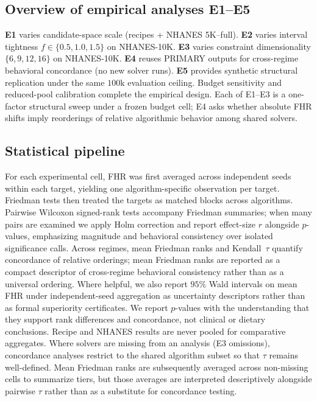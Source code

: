 \documentclass[lettersize,journal]{IEEEtran}
\begin{document}
\subsection{Overview of empirical analyses E1--E5}
\textbf{E1} varies candidate-space scale (recipes + NHANES 5K--full).
\textbf{E2} varies interval tightness $f\in\{0.5,1.0,1.5\}$ on NHANES-10K.
\textbf{E3} varies constraint dimensionality $\{6,9,12,16\}$ on NHANES-10K.
\textbf{E4} reuses PRIMARY outputs for cross-regime behavioral concordance (no new solver runs).
\textbf{E5} provides synthetic structural replication under the same $100\mathrm{k}$ evaluation ceiling.
Budget sensitivity and reduced-pool calibration complete the empirical design.
Each of E1--E3 is a one-factor structural sweep under a frozen budget cell; E4 asks whether absolute FHR shifts imply reorderings of relative algorithmic behavior among shared solvers.

\subsection{Statistical pipeline}
For each experimental cell, FHR was first averaged across independent seeds within each target, yielding one algorithm-specific observation per target.
Friedman tests then treated the targets as matched blocks across algorithms.
Pairwise Wilcoxon signed-rank tests accompany Friedman summaries; when many pairs are examined we apply Holm correction and report effect-size $r$ alongside $p$-values, emphasizing magnitude and behavioral consistency over isolated significance calls.
Across regimes, mean Friedman ranks and Kendall~$\tau$ quantify concordance of relative orderings; mean Friedman ranks are reported as a compact descriptor of cross-regime behavioral consistency rather than as a universal ordering.
Where helpful, we also report $95\%$ Wald intervals on mean FHR under independent-seed aggregation as uncertainty descriptors rather than as formal superiority certificates.
We report $p$-values with the understanding that they support rank differences and concordance, not clinical or dietary conclusions.
Recipe and NHANES results are never pooled for comparative aggregates.
Where solvers are missing from an analysis (E3 omissions), concordance analyses restrict to the shared algorithm subset so that $\tau$ remains well-defined.
Mean Friedman ranks are subsequently averaged across non-missing cells to summarize tiers, but those averages are interpreted descriptively alongside pairwise $\tau$ rather than as a substitute for concordance testing.
\end{document}

